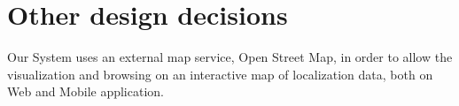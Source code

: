 \section{Other design decisions}

Our System uses an external map service, Open Street Map, in order to allow the visualization and browsing on an interactive map of localization data, both on Web and Mobile application. 